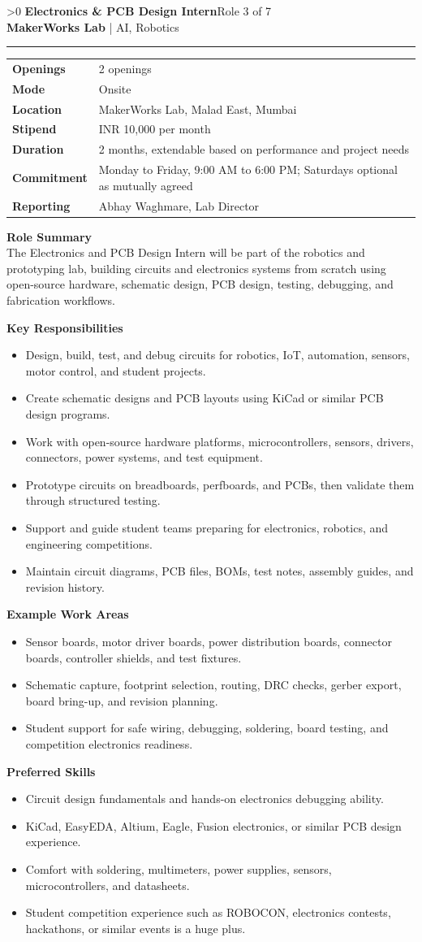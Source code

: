\documentclass[10pt,a4paper]{article}
\newcommand{\CommonLocation}{MakerWorks Lab, Malad East, Mumbai}
\newcommand{\CommonStipend}{INR 10,000 per month}
\newcommand{\CommonDuration}{2 months, extendable based on performance and project needs}
\newcommand{\CommonCommitment}{Monday to Friday, 9:00 AM to 6:00 PM; Saturdays optional as mutually agreed}
\newcommand{\CommonReporting}{Abhay Waghmare, Lab Director}
\newcounter{rolepage}
\newcommand{\RolePage}[3]{%
  \ifnum\value{rolepage}>0\clearpage\fi
  \stepcounter{rolepage}
  \thispagestyle{plain}
  {\Large\textbf{#1}}\hfill{\small #2}\\
  {\small\textbf{MakerWorks Lab} | AI, Robotics}\\[4pt]
  \hrule
  \vspace{6pt}
  #3
}
\newcommand{\DetailsTable}[3]{%
\begin{tabularx}{\linewidth}{>{\bfseries}p{30mm}X}
Openings & #3 \\
Mode & #1 \\
Location & #2 \\
Stipend & \CommonStipend \\
Duration & \CommonDuration \\
Commitment & \CommonCommitment \\
Reporting & \CommonReporting \\
\end{tabularx}
}
\newcommand{\RoleSection}[1]{\vspace{5pt}\par\noindent\textbf{#1}\par\vspace{2pt}}
\begin{document}
\RolePage{Electronics \& PCB Design Intern}{Role 3 of 7}{
\DetailsTable{Onsite}{\CommonLocation}{2 openings}

\textbf{Role Summary}\\
The Electronics and PCB Design Intern will be part of the robotics and prototyping lab, building circuits and electronics systems from scratch using open-source hardware, schematic design, PCB design, testing, debugging, and fabrication workflows.

\RoleSection{Key Responsibilities}
\begin{itemize}
  \item Design, build, test, and debug circuits for robotics, IoT, automation, sensors, motor control, and student projects.
  \item Create schematic designs and PCB layouts using KiCad or similar PCB design programs.
  \item Work with open-source hardware platforms, microcontrollers, sensors, drivers, connectors, power systems, and test equipment.
  \item Prototype circuits on breadboards, perfboards, and PCBs, then validate them through structured testing.
  \item Support and guide student teams preparing for electronics, robotics, and engineering competitions.
  \item Maintain circuit diagrams, PCB files, BOMs, test notes, assembly guides, and revision history.
\end{itemize}

\RoleSection{Example Work Areas}
\begin{itemize}
  \item Sensor boards, motor driver boards, power distribution boards, connector boards, controller shields, and test fixtures.
  \item Schematic capture, footprint selection, routing, DRC checks, gerber export, board bring-up, and revision planning.
  \item Student support for safe wiring, debugging, soldering, board testing, and competition electronics readiness.
\end{itemize}

\RoleSection{Preferred Skills}
\begin{itemize}
  \item Circuit design fundamentals and hands-on electronics debugging ability.
  \item KiCad, EasyEDA, Altium, Eagle, Fusion electronics, or similar PCB design experience.
  \item Comfort with soldering, multimeters, power supplies, sensors, microcontrollers, and datasheets.
  \item Student competition experience such as ROBOCON, electronics contests, hackathons, or similar events is a huge plus.
\end{itemize}

}
\end{document}
